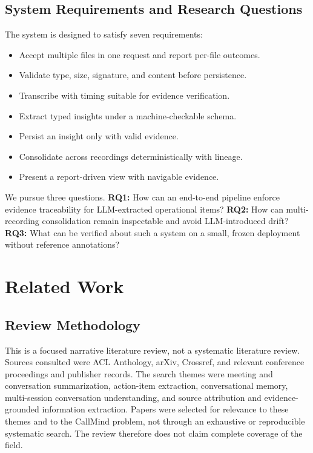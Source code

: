\documentclass[conference,a4paper]{IEEEtran}
\begin{document}
\subsection{System Requirements and Research Questions}

The system is designed to satisfy seven requirements:
\begin{itemize}
\item[R1] Accept multiple files in one request and report per-file outcomes.
\item[R2] Validate type, size, signature, and content before persistence.
\item[R3] Transcribe with timing suitable for evidence verification.
\item[R4] Extract typed insights under a machine-checkable schema.
\item[R5] Persist an insight only with valid evidence.
\item[R6] Consolidate across recordings deterministically with lineage.
\item[R7] Present a report-driven view with navigable evidence.
\end{itemize}

We pursue three questions. \textbf{RQ1:} How can an end-to-end pipeline enforce
evidence traceability for LLM-extracted operational items? \textbf{RQ2:} How can
multi-recording consolidation remain inspectable and avoid LLM-introduced drift?
\textbf{RQ3:} What can be verified about such a system on a small, frozen deployment
without reference annotations?

\section{Related Work}

\subsection{Review Methodology}

This is a focused narrative literature review, not a systematic literature review. Sources
consulted were ACL Anthology, arXiv, Crossref, and relevant conference proceedings and
publisher records. The search themes were meeting and conversation summarization,
action-item extraction, conversational memory, multi-session conversation understanding,
and source attribution and evidence-grounded information extraction. Papers were selected
for relevance to these themes and to the CallMind problem, not through an exhaustive or
reproducible systematic search. The review therefore does not claim complete coverage of
the field.
\end{document}
